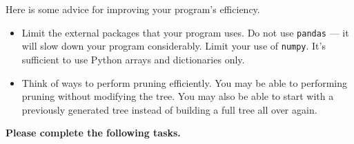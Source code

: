 \documentclass[12pt]{article}
\begin{document}
Here is some advice for improving your program's efficiency. 
\begin{itemize}
\item Limit the external packages that your program uses. Do not use \verb+pandas+ --- it will slow down your program considerably. Limit your use of \verb+numpy+. It's sufficient to use Python arrays and dictionaries only.

\item Think of ways to perform pruning efficiently. You may be able to performing pruning without modifying the tree. You may also be able to start with a previously generated tree instead of building a full tree all over again.
\end{itemize}

{\bf Please complete the following tasks.}
\end{document}
